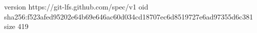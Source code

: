 version https://git-lfs.github.com/spec/v1
oid sha256:f523afed95202e64b69e646ac60d034cd18707ec6d8519727e6ad97355d6c381
size 419

